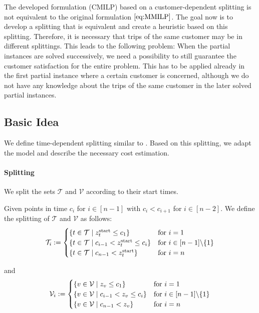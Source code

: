 The developed formulation (CMILP) based on a customer-dependent splitting is not equivalent to the original formulation $\eqref{eq:MMILP}$. The goal now is to develop a splitting that is equivalent and create a heuristic based on this splitting. Therefore, it is necessary that trips of the same customer may be in different splittings. This leads to the following problem: When the partial instances are solved successively, we need a possibility to still guarantee the customer satisfaction for the entire problem. This has to be applied already in the first partial instance where a certain customer is concerned, although we do not have any knowledge about the trips of the same customer in the later solved partial instances.

\subsection{Basic Idea}
\label{sec:basic_idea}

We define time-dependent splitting similar to \cite{Knoll}. Based on this splitting, we adapt the model and describe the necessary cost estimation.

\paragraph{Splitting} \parfill

We split the sets $\mathcal{T}$ and $\mathcal{V}$ according to their start times.

\begin{definition}
\label{def:time_dependent_splitting}

Given points in time $c_i$ for $i\in[n-1]$ with $c_i<c_{i+1}$ for $i\in[n-2]$. We define the splitting of $\mathcal{T}$ and $\mathcal{V}$ as follows:
\begin{align*}
	\mathcal{T}_i := \begin{cases}
		\left\{t\in\mathcal{T}\mid z^{\operatorname{start}}_t\leq c_1\right\} & \text{for } i=1 \\
		\left\{t\in\mathcal{T}\mid c_{i-1}<z^{\operatorname{start}}_t\leq c_i\right\} & \text{for } i\in[n-1]\backslash\{1\} \\
		\left\{t\in\mathcal{T}\mid c_{n-1}<z^{\operatorname{start}}_t\right\} & \text{for } i=n
	\end{cases}
\end{align*}

and
\begin{align*}
	\mathcal{V}_i := \begin{cases}
		\left\{v\in\mathcal{V}\mid z_v\leq c_1\right\} & \text{for } i=1 \\
		\left\{v\in\mathcal{V}\mid c_{i-1}<z_v\leq c_i\right\} & \text{for } i\in[n-1]\backslash\{1\} \\
		\left\{v\in\mathcal{V}\mid c_{n-1}<z_v\right\} & \text{for } i=n
	\end{cases}
\end{align*}

\end{definition}

